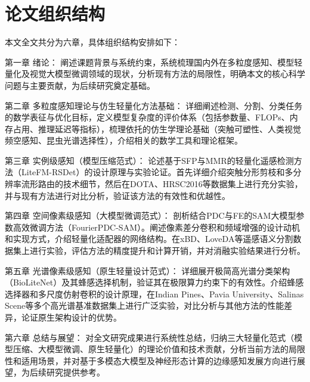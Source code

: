 \section{论文组织结构}
本文全文共分为六章，具体组织结构安排如下：

第一章 绪论： 阐述课题背景与系统约束，系统梳理国内外在多粒度感知、模型轻量化及视觉大模型微调领域的现状，分析现有方法的局限性，明确本文的核心科学问题与主要贡献，为后续研究奠定基础。

第二章 多粒度感知理论与仿生轻量化方法基础： 详细阐述检测、分割、分类任务的数学表征与优化目标，定义模型复杂度的评价体系（包括参数量、FLOPs、内存占用、推理延迟等指标），梳理依托的仿生学理论基础（突触可塑性、人类视觉频空感知、昆虫光谱选择性），介绍相关的数学工具和理论框架。

第三章 实例级感知（模型压缩范式）： 论述基于SFP与MMR的轻量化遥感检测方法（LiteFM-RSDet）的设计原理与实验论证。首先详细介绍突触分形剪枝和多分辨率流形路由的技术细节，然后在DOTA、HRSC2016等数据集上进行充分实验，并与现有方法进行对比分析，验证该方法的有效性和优越性。

第四章 空间像素级感知（大模型微调范式）： 剖析结合PDC与FE的SAM大模型参数高效微调方法（FourierPDC-SAM）。阐述像素差分卷积和频域增强的设计动机和实现方式，介绍轻量化适配器的网络结构。在xBD、LoveDA等遥感语义分割数据集上进行实验，评估方法的精度提升和计算开销，并对消融实验结果进行分析。

第五章 光谱像素级感知（原生轻量设计范式）： 详细展开极简高光谱分类架构（BioLiteNet）及其蜂感选择机制，验证其在极限算力约束下的有效性。介绍蜂感选择器和多尺度仿射卷积的设计原理，在Indian Pines、Pavia University、Salinas Scene等多个高光谱基准数据集上进行广泛实验，对比分析与其他方法的性能差异，论证原生架构设计的优势。

第六章 总结与展望： 对全文研究成果进行系统性总结，归纳三大轻量化范式（模型压缩、大模型微调、原生轻量化）的理论价值和技术贡献，分析当前方法的局限性和适用场景，并对基于多模态大模型及神经形态计算的边缘感知发展方向进行展望，为后续研究提供参考。



